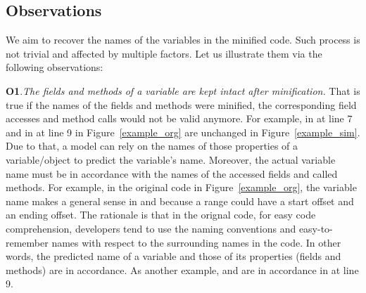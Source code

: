 \subsection{Observations}



We aim to recover the names of the variables in the minified
code. Such process is not trivial and affected by multiple factors.
Let us illustrate them via the following observations:






\textbf{O1}.{\em The fields and methods of a variable are kept intact
  after minification.} That is true if the names of the fields and
methods were minified, the corresponding field accesses and method
calls would not be valid anymore. For example,  in
 at line 7 and  in
 at line 9 in Figure~\ref{example_org} are
unchanged in Figure~\ref{example_sim}. Due to that, a model can rely
on the names of those properties of a variable/object to predict the
variable's name.
%
Moreover, the actual variable name must be in accordance with the
names of the accessed fields and called methods. For example, in the
original code in Figure~\ref{example_org}, the variable name
 makes a general sense in  and
 because a range could have a start offset and
an ending offset. The rationale is that in the orignal code, for easy
code comprehension, developers tend to use the naming conventions and
easy-to-remember names with respect to the surrounding names in the
code. In other words, the predicted name of a variable and those of
its properties (fields and methods) are in accordance. As another
example,  and  are in accordance
in  at line 9.


